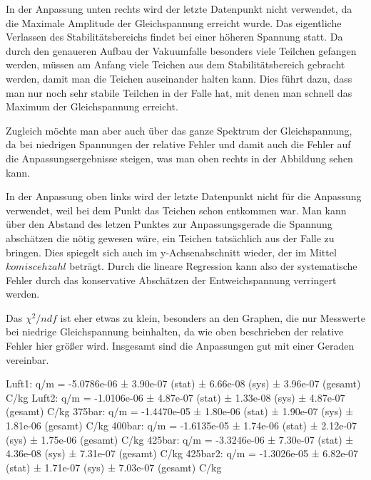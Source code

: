 \documentclass[a4paper,12pt]{article}
\begin{document}
In der Anpassung unten rechts wird der letzte Datenpunkt nicht verwendet, da die Maximale Amplitude der Gleichspannung erreicht wurde.
Das eigentliche Verlassen des Stabilitätsbereichs findet bei einer höheren Spannung statt.
Da durch den genaueren Aufbau der Vakuumfalle besonders viele Teilchen gefangen werden, müssen am Anfang viele Teichen aus dem Stabilitätsbereich gebracht werden, damit man die Teichen auseinander halten kann.
Dies führt dazu, dass man nur noch sehr stabile Teilchen in der Falle hat, mit denen man schnell das Maximum der Gleichspannung erreicht.

Zugleich möchte man aber auch über das ganze Spektrum der Gleichspannung, da bei niedrigen Spannungen der relative Fehler und damit auch die Fehler auf die Anpassungsergebnisse steigen, was man oben rechts in der Abbildung sehen kann.


In der Anpassung oben links wird der letzte Datenpunkt nicht für die Anpassung verwendet, weil bei dem Punkt das Teichen schon entkommen war.
Man kann über den Abstand des letzen Punktes zur Anpassungsgerade die Spannung abschätzen die nötig gewesen wäre, ein Teichen tatsächlich aus der Falle zu bringen.
Dies spiegelt sich auch im y-Achsenabschnitt wieder, der im Mittel $komisceh zahl$ beträgt.
Durch die lineare Regression kann also der systematische Fehler durch das konservative Abschätzen der Entweichspannung verringert werden.


Das $χ^2/ndf$ ist eher etwas zu klein, besonders an den Graphen, die nur Messwerte bei niedrige Gleichspannung beinhalten, da wie oben beschrieben der relative Fehler hier größer wird.
Insgesamt sind die Anpassungen gut mit einer Geraden vereinbar.



Luft1: q/m = -5.0786e-06 ± 3.90e-07 (stat) ± 6.66e-08 (sys) ± 3.96e-07 (gesamt) C/kg
Luft2: q/m = -1.0106e-06 ± 4.87e-07 (stat) ± 1.33e-08 (sys) ± 4.87e-07 (gesamt) C/kg
375bar: q/m = -1.4470e-05 ± 1.80e-06 (stat) ± 1.90e-07 (sys) ± 1.81e-06 (gesamt) C/kg
400bar: q/m = -1.6135e-05 ± 1.74e-06 (stat) ± 2.12e-07 (sys) ± 1.75e-06 (gesamt) C/kg
425bar: q/m = -3.3246e-06 ± 7.30e-07 (stat) ± 4.36e-08 (sys) ± 7.31e-07 (gesamt) C/kg
425bar2: q/m = -1.3026e-05 ± 6.82e-07 (stat) ± 1.71e-07 (sys) ± 7.03e-07 (gesamt) C/kg
\end{document}
